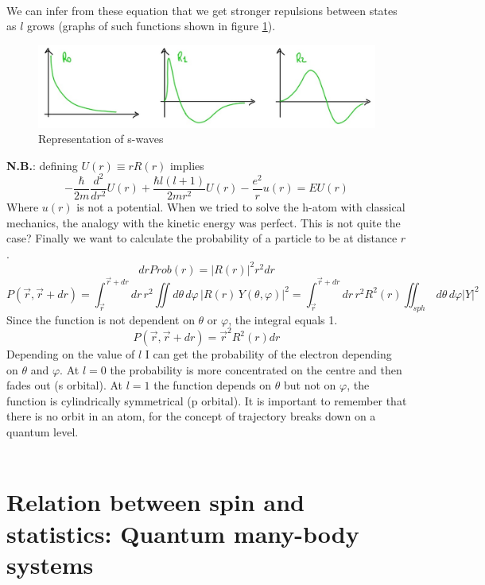 \\
We can infer from these equation that we get stronger repulsions between states as $l$ grows (graphs of such functions shown in figure \ref{fig_swaves}).\\
\begin{figure}[htbp!]
	\centering
	\includegraphics[scale=0.30]{img_5.jpg}
	\caption{Representation of s-waves}
	\label{fig_swaves}
\end{figure}
\textbf{N.B.}: defining $U(r) \equiv rR(r)$ implies
\[
-\frac{\hbar}{2m} \frac{d^2}{dr^2} U(r) + \frac{\hbar l(l+1)}{2mr^2} U(r) - \frac{e^2}{r} u(r) = E U(r)
\]
Where $u(r)$ is not a potential. When we tried to solve the h-atom with classical mechanics, the analogy with the kinetic energy was perfect. This is not quite the case?
Finally we want to calculate the probability of a particle to be at distance $r$.
\[
drProb(r)=|R(r)|^2r^2dr
\]
\[
P(\vec{r},\vec{r}+dr)=\int_{\vec{r}}^{\vec{r}+dr}dr\,r^2\iint d\theta\,d\varphi\,|R(r)\,Y(\theta,\varphi)|^2=\int_{\vec{r}}^{\vec{r}+dr}dr\,r^2R^2(r)\iint_{sph}\,d\theta\,d\varphi|Y|^2
\]
Since the function is not dependent on $\theta$ or $\varphi$, the integral equals 1.
\[
P(\vec{r},\vec{r}+dr)=\vec{r}^2R^2(r)dr
\]
Depending on the value of $l$ I can get the probability of the electron depending on $\theta$ and $\varphi$. At $l=0$ the probability is more concentrated on the centre and then fades out (s orbital). At $l=1$ the function depends on $\theta$ but not on $\varphi$, the function is cylindrically symmetrical (p orbital). It is important to remember that there is no orbit in an atom, for the concept of trajectory breaks down on a quantum level.\\
\\

\section{Relation between spin and statistics: Quantum many-body systems}
